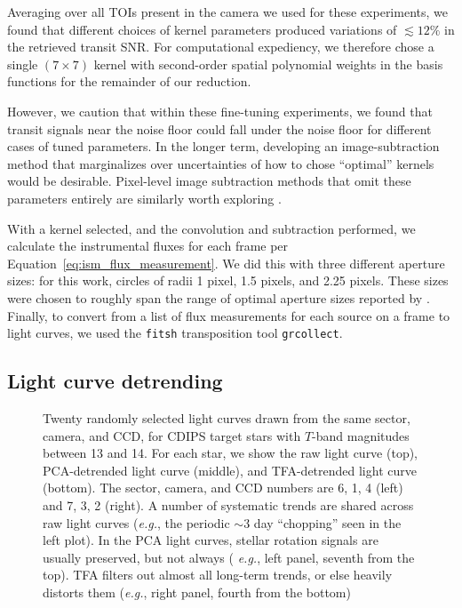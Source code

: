 \documentclass[12pt,twocolumn,tighten]{aastex62}
\begin{document}
Averaging over all TOIs present in the camera we used for these
experiments, we found that different choices of kernel parameters
produced variations of $\lesssim 12\%$ in the retrieved transit SNR.
For computational expediency, we therefore chose a single $(7\times
7)$ kernel with second-order spatial polynomial weights in the basis
functions for the remainder of our reduction.

However, we caution that within these fine-tuning experiments, we
found that transit signals near the noise floor could fall under the
noise floor for different cases of tuned parameters.  In the longer
term, developing an image-subtraction method that marginalizes over
uncertainties of how to chose ``optimal'' kernels would be desirable.
Pixel-level image subtraction methods that omit these parameters
entirely are similarly worth exploring \citep{wang_pixel-level_2017}.

With a kernel selected, and the convolution and subtraction performed,
we calculate the instrumental fluxes for each frame per
Equation~\ref{eq:ism_flux_measurement}.  We did this with three
different aperture sizes: for this work, circles of radii 1 pixel, 1.5
pixels, and 2.25 pixels.  These sizes were chosen to roughly span the
range of optimal aperture sizes reported by
\citet{Sullivan_et_al_2015}.  Finally, to convert from a list of flux
measurements for each source on a frame to light curves, we used the
\texttt{fitsh} transposition tool \texttt{grcollect}.

\subsection{Light curve detrending}
\label{subsec:lcdetrending}

\begin{figure}[!t]
	\vspace{-0.5cm}
	\caption{
    Twenty randomly selected light curves drawn from the same sector,
    camera, and CCD, for CDIPS target stars with $T$-band magnitudes
    between 13 and 14.  For each star, we show the raw light curve
    (top), PCA-detrended light curve (middle), and TFA-detrended light
    curve (bottom).  The sector, camera, and CCD numbers are 6, 1, 4
    (left) and 7, 3, 2 (right).  A number of systematic trends are
    shared across raw light curves ({\it e.g.}, the periodic $\sim$3 day
    ``chopping'' seen in the left plot).  In the PCA light curves,
    stellar rotation signals are usually preserved, but not always ({\it
    e.g.}, left panel, seventh from the top).  TFA filters out almost
    all long-term trends, or else heavily distorts them ({\it e.g.},
    right panel, fourth from the bottom)
	\label{fig:lc_systematics_dtr}
	}
\end{figure}
\end{document}
